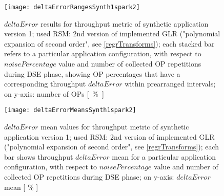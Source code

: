 \begin{figure}[H]

    \centering
    
    \texttt{[image: deltaErrorRangesSynth1spark2]}
    
     \caption[$deltaError$ results for throughput metric of synthetic application version 1; used RSM: 2nd version of implemented GLR ("polynomial expansion of second order")]{$deltaError$ results for throughput metric of synthetic application version 1; used RSM: 2nd version of implemented GLR ("polynomial expansion of second order", see \ref{regrTransforms}); each stacked bar refers to a particular application configuration, with respect to $noisePercentage$ value and number of collected OP repetitions during DSE phase, showing OP percentages that have a corresponding throughput $deltaError$ within prearranged intervals; on y-axis: number of OPs \hbox{[ \% ]}}
    
    \label{fig::synth1spark2::intervals}
    
\end{figure}

\begin{figure}[H]

    \centering
    
    \texttt{[image: deltaErrorMeansSynth1spark2]}
    
    \caption[$deltaError$ mean values for throughput metric of synthetic application version 1; used RSM: 2nd version of implemented GLR ("polynomial expansion of second order")]{$deltaError$ mean values for throughput metric of synthetic application version 1; used RSM: 2nd version of implemented GLR ("polynomial expansion of second order", see \ref{regrTransforms}); each bar shows throughput $deltaError$ mean for a particular application configuration, with respect to $noisePercentage$ value and number of collected OP repetitions during DSE phase; on y-axis: $deltaError$ mean [ \% ]}
    
    \label{fig::synth1spark2::means}
    
\end{figure}





